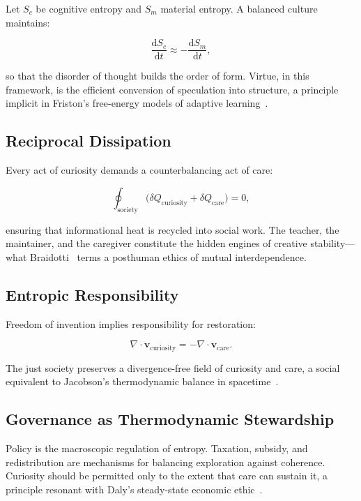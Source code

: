\documentclass[12pt,a4paper]{article}
\theoremstyle{definition}
\newcommand{\ddt}[1]{\frac{\mathrm{d}#1}{\mathrm{d}t}}
\begin{document}
Let $S_c$ be cognitive entropy and $S_m$ material entropy.  A balanced culture
maintains:

\begin{equation}
  \ddt{S_c} \approx -\ddt{S_m},
\end{equation}

so that the disorder of thought builds the order of form.  Virtue, in this
framework, is the efficient conversion of speculation into structure, a
principle implicit in Friston's free-energy models of adaptive
learning~\citep{friston2023}.

\subsection{Reciprocal Dissipation}

Every act of curiosity demands a counterbalancing act of care:

\begin{equation}
  \oint_{\mathrm{society}} \bigl(\delta Q_{\mathrm{curiosity}}
  + \delta Q_{\mathrm{care}}\bigr) = 0,
  \label{eq:reciprocal}
\end{equation}

ensuring that informational heat is recycled into social work.  The teacher, the
maintainer, and the caregiver constitute the hidden engines of creative
stability---what Braidotti~\citeyearpar{braidotti2017} terms a posthuman ethics
of mutual interdependence.

\subsection{Entropic Responsibility}

Freedom of invention implies responsibility for restoration:

\begin{equation}
  \nabla \cdot \mathbf{v}_{\mathrm{curiosity}}
  = -\nabla \cdot \mathbf{v}_{\mathrm{care}}.
\end{equation}

The just society preserves a divergence-free field of curiosity and care, a
social equivalent to Jacobson's thermodynamic balance in
spacetime~\citep{jacobson1995}.

\subsection{Governance as Thermodynamic Stewardship}

Policy is the macroscopic regulation of entropy.  Taxation, subsidy, and
redistribution are mechanisms for balancing exploration against coherence.
Curiosity should be permitted only to the extent that care can sustain it, a
principle resonant with Daly's steady-state economic
ethic~\citep{daly1977,foster2020}.
\end{document}
